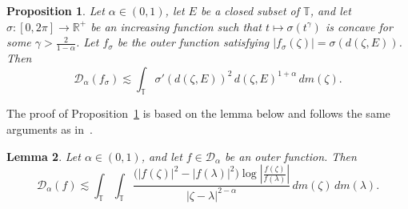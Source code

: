 \documentclass[12pt,reqno,a4paper]{amsart}
\newtheorem{prop}{Proposition}[section]
\newtheorem{lem}[prop]{Lemma}
\newcommand\TT{\mathbb{T}}
\newcommand{\cD}{{\mathcal{D}}}
\numberwithin{equation}{section}
\begin{document}
	\begin{prop}\label{llem}
		Let \( \alpha \in (0, 1) \), let \( E \) be a closed subset of \( \mathbb{T} \), and let \( \sigma : [0, 2\pi] \to \mathbb{R}^+ \) be an increasing function such that \( t \mapsto \sigma(t^\gamma) \) is concave for some \( \gamma > \frac{2}{1 - \alpha} \). Let \( f_\sigma \) be the outer function satisfying \( |f_\sigma(\zeta)| = \sigma(d(\zeta, E)) \). Then
		\[
		\cD_\alpha(f_\sigma) \lesssim \int_{\TT} \sigma'(d(\zeta, E))^2 \, d(\zeta, E)^{1 + \alpha} \, dm(\zeta).
		\]
	\end{prop}
	The proof of Proposition~\ref{llem} is based on the lemma below and follows the same arguments as in~\cite{EKR}.
	\begin{lem}\label{Carlesontype}
		Let $\alpha \in (0,1)$, and let $f \in \cD_\alpha$ be an outer function. Then
		\[
		\cD_\alpha(f)
		\lesssim
		\int_{\mathbb T}
		\int_{\mathbb T}
		\frac{\bigl(|f(\zeta)|^2 - |f(\lambda)|^2\bigr)
			\log \left|\frac{f(\zeta)}{f(\lambda)}\right|}
		{|\zeta-\lambda|^{2-\alpha}}
		\, dm(\zeta)\, dm(\lambda).
		\]
	\end{lem}
\end{document}
